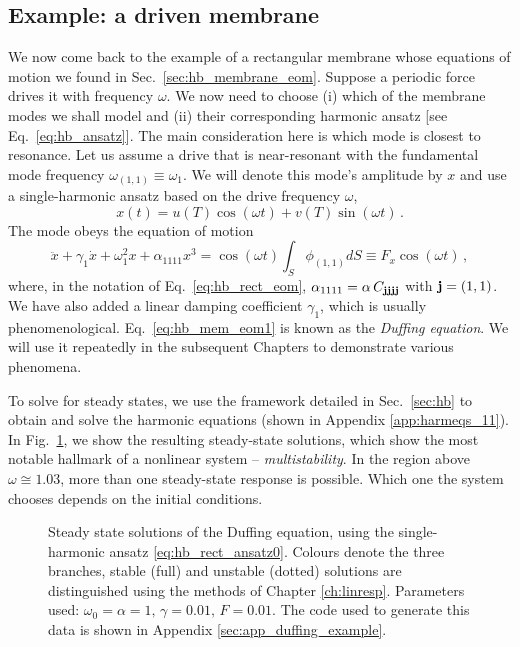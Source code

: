 \subsection{Example: a driven membrane} \label{sec:hb_mem_driven}
We now come back to the example of a rectangular membrane whose equations of motion we found in Sec.~\ref{sec:hb_membrane_eom}. Suppose a periodic force drives it with frequency $\omega$. We now need to choose (i) which of the membrane modes we shall model and (ii) their corresponding harmonic ansatz [see Eq.~\eqref{eq:hb_ansatz}]. The main consideration here is which mode is closest to resonance. Let us assume a drive that is near-resonant with the fundamental mode frequency $\omega_{(1,1)} \equiv \omega_1$. We will denote this mode's amplitude by $x$ and use a single-harmonic ansatz based on the drive frequency $\omega$,
\begin{equation} \label{eq:hb_rect_ansatz0}
x(t) = u(T) \cos(\omega t) + v(T) \sin(\omega t) \,.
\end{equation}
The mode obeys the equation of motion
\begin{equation} \label{eq:hb_mem_eom1}
\ddot{x} + \gamma_1 \dot{x} + \omega_1^2 x + \alpha_{1111} x^3 = \cos(\omega t) \int_S \phi_{(1,1)} dS \equiv F_x \cos(\omega t)\,,
\end{equation}
where, in the notation of Eq.~\eqref{eq:hb_rect_eom}, $\alpha_{1111} = \alpha\, C_{\vb{jjjj}}$ with $\vb{j} = (1,1)$. We have also added a linear damping coefficient $\gamma_{1}$, which is usually phenomenological. 
Eq.~\eqref{eq:hb_mem_eom1} is known as the \textit{Duffing equation}. We will use it repeatedly in the subsequent Chapters to demonstrate various phenomena. 

To solve for steady states, we use the framework detailed in Sec.~\ref{sec:hb} to obtain and solve the harmonic equations (shown in Appendix \ref{app:harmeqs_11}). In Fig.~\ref{fig:hb_Duffing}, we show the resulting steady-state solutions, which show the most notable hallmark of a nonlinear system -- \textit{multistability}. In the region above $\omega \cong 1.03$, more than one steady-state response is possible. Which one the system chooses depends on the initial conditions.
\begin{figure}
	\centering
	
	\caption{Steady state solutions of the Duffing equation, using the single-harmonic ansatz \eqref{eq:hb_rect_ansatz0}. Colours denote the three branches, stable (full) and unstable (dotted) solutions are distinguished using the methods of Chapter \ref{ch:linresp}. Parameters used: $\omega_0 = \alpha = 1, \, \gamma = 0.01,\,F = 0.01$. The code used to generate this data is shown in Appendix \ref{sec:app_duffing_example}.}
	\label{fig:hb_Duffing}
\end{figure}

